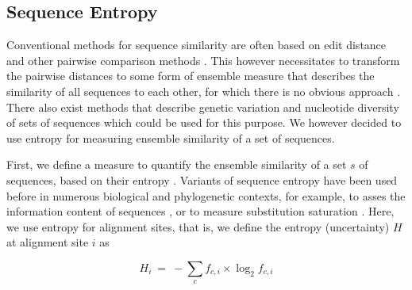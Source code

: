 \subsection{Sequence Entropy}
\label{ch:AutomaticTrees:sec:Method:sub:SequenceSimilarity}

Conventional methods for sequence similarity are often based on edit distance
and other pairwise comparison methods \cite{Needleman1970,Smith1981,Altschul1990}.
This however necessitates to transform the pairwise distances to some form of ensemble measure
that describes the similarity of all sequences to each other, for which there is no obvious approach \cite{Zhou2006}.
There also exist methods that describe genetic variation and
nucleotide diversity of sets of sequences \cite{Nei1979,Blaisdell1986} which could be used for this purpose.
We however decided to use entropy for measuring ensemble similarity of a set of sequences.

First, we define a measure to quantify the ensemble similarity of a set $s$ of sequences,
based on their entropy \cite{Shannon1951}.
Variants of sequence entropy have been used before in numerous biological and phylogenetic contexts,
for example, to asses the information content of sequences
\cite{Schmitt1997,Vinga2003,Vinga2004,Li2005,Criscuolo2010,Comin2012,Vinga2014},
or to measure substitution saturation \cite{Xia2003}.
Here, we use entropy for alignment sites, that is, we define the entropy (uncertainty) $H$ at alignment site $i$ as

\begin{equation*}
    H_{i} ~=~ -\sum_c f_{c,i} \times \log_{2} f_{c,i}
\end{equation*}

